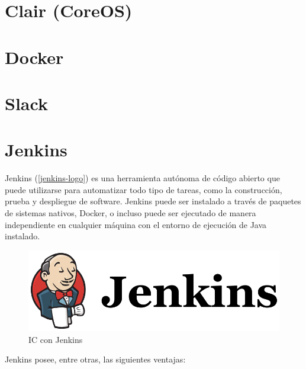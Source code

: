 \section{Clair (CoreOS)}



\section{Docker}



\section{Slack}



\section{Jenkins}

Jenkins (\autoref{jenkins-logo}) es una herramienta autónoma de código abierto que puede utilizarse para automatizar todo tipo de tareas, como la construcción, prueba y despliegue de software. Jenkins puede ser instalado a través de paquetes de sistemas nativos, Docker, o incluso puede ser ejecutado de manera independiente en cualquier máquina con el entorno de ejecución de Java instalado\cite{jenkins2017}.


\begin{figure}[htbp]
	\centering
	\includegraphics[width=0.80\linewidth]
	{entorno/figuras/jenkins.png}
	\caption{\gls{IC} con Jenkins}
	\label{jenkins-logo}
\end{figure}


Jenkins posee, entre otras, las siguientes ventajas:


